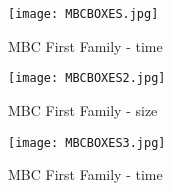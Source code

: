 \documentclass[a4paper,10pt]{book}
\begin{document}
\begin{figure}[!htpb]
\begin{center}
\texttt{[image: MBCBOXES.jpg]}
\end{center}
\caption{MBC First Family - time}
\end{figure}

\begin{figure}[!htpb]
\begin{center}
\texttt{[image: MBCBOXES2.jpg]}
\end{center}
\caption{MBC First Family - size}
\end{figure}

\begin{figure}[!htpb]
\begin{center}
\texttt{[image: MBCBOXES3.jpg]}
\end{center}
\caption{MBC First Family - time}
\end{figure}
 
\end{document}

